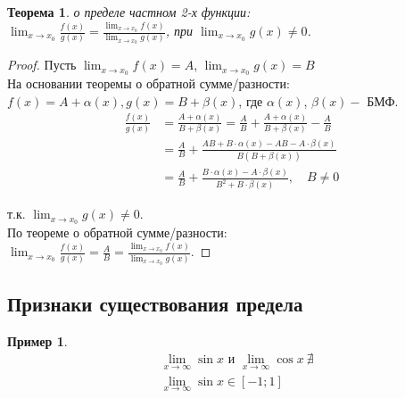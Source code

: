 \documentclass[12pt, a4paper]{article}
\newtheorem{theorem}{Теорема}[subsection]
\newtheorem{example}{Пример}[subsection]
\theoremstyle{remark}
\begin{document}
	\begin{theorem}
		о пределе частном 2-х функции: \\
		
		$\lim_{x \to x_0} \frac{f(x)}{g(x)} = \frac{\lim_{x \to x_0} f(x)}{\lim_{x \to x_0} g(x)}$, при $\lim_{x \to x_0} g(x) \neq 0$.
	\end{theorem}
	
	\begin{proof}
		Пусть $\lim_{x \to x_0} f(x) = A$, $\lim_{x \to x_0} g(x) = B$ \\
		
		На основании теоремы о обратной сумме/разности: \\
		
		$f(x) = A + \alpha(x), g(x) = B + \beta(x)$, где $\alpha(x)$, $\beta(x) -$ БМФ. \\
		
		\begin{align*}
			\frac{f(x)}{g(x)} &= \frac{A + \alpha(x)}{B + \beta(x)} = \frac{A}{B} + \frac{A + \alpha(x)}{B + \beta(x)} - \frac{A}{B} \\
			&= \frac{A}{B} + \frac{AB + B \cdot \alpha(x) - AB - A \cdot \beta(x)}{B(B + \beta(x))} \\
			&= \frac{A}{B} + \frac{B \cdot \alpha(x) - A \cdot \beta(x)}{B^2 + B \cdot \beta(x)}, \quad B \neq 0
		\end{align*}
		
		т.к. $\lim_{x \to x_0} g(x) \neq 0$. \\
		
		По теореме о обратной сумме/разности: \\
		
		$\lim_{x \to x_0} \frac{f(x)}{g(x)} = \frac{A}{B} = \frac{\lim_{x \to x_0} f(x)}{\lim_{x \to x_0} g(x)}$. 
	\end{proof}
	
	\subsection{Признаки существования предела}
	
	\begin{example}
		\begin{align*}
			&\lim_{x \to \infty} \sin x \text{ и } \lim_{x \to \infty} \cos x \ \nexists \\
			&\lim_{x \to \infty} \sin x \in [-1; 1]
		\end{align*}
	\end{example}
	
\end{document}
